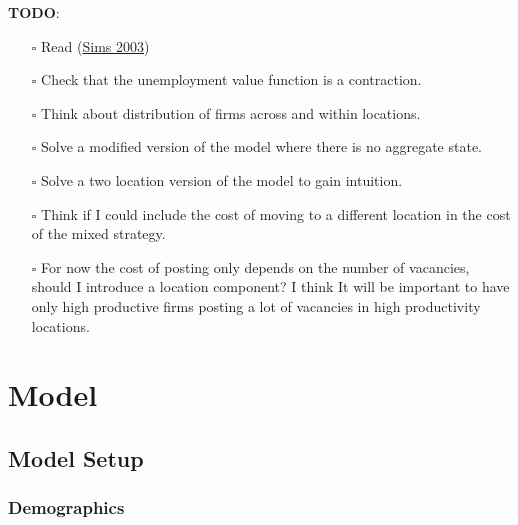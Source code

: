 \documentclass[
  letterpaper,
  DIV=11,
  numbers=noendperiod]{scrreprt}
\providecommand{\tightlist}{%
  \setlength{\itemsep}{0pt}\setlength{\parskip}{0pt}}\usepackage{longtable,booktabs,array}
\begin{document}
\textbf{TODO}:

\begin{itemize}
\tightlist
\item[$\square$]
  Read
  (\protect\hyperlink{ref-simsImplicationsRationalInattention2003}{Sims
  2003})
\item[$\square$]
  Check that the unemployment value function is a contraction.
\item[$\square$]
  Think about distribution of firms across and within locations.
\item[$\square$]
  Solve a modified version of the model where there is no aggregate
  state.
\item[$\square$]
  Solve a two location version of the model to gain intuition.
\item[$\square$]
  Think if I could include the cost of moving to a different location in
  the cost of the mixed strategy.
\item[$\square$]
  For now the cost of posting only depends on the number of vacancies,
  should I introduce a location component? I think It will be important
  to have only high productive firms posting a lot of vacancies in high
  productivity locations.
\end{itemize}


\hypertarget{model}{%
\chapter{Model}\label{model}}

\hypertarget{model-setup}{%
\section{Model Setup}\label{model-setup}}

\hypertarget{demographics}{%
\subsection{Demographics}\label{demographics}}
\end{document}
